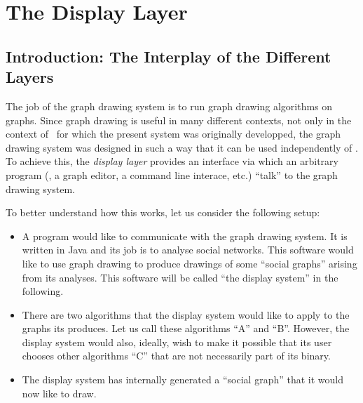 %
%
%


\section{The Display Layer}

{}


\label{section-gd-display-layer}


\subsection{Introduction: The Interplay of the Different Layers}

The job of the graph drawing system is to run graph drawing algorithms
on graphs. Since graph drawing is useful in many different contexts,
not only in the context of \tikzname\ for which the present system was
originally developped, the graph drawing system was designed in such a
way that it can be used independently of \tikzname. To achieve this,
the \emph{display layer} provides an interface via which an arbitrary
program (\tikzname, a graph editor, a command line interace, etc.)
``talk'' to the graph drawing system.

To better understand how this works, let us consider the following
setup: 

\begin{itemize}
\item A program would like to communicate with the graph
  drawing system. It is written in Java and its job is to analyse social
  networks. This software would like to use graph drawing to produce
  drawings of some ``social graphs'' arising from its analyses. This
  software will be called ``the display system'' in the following.
\item There are two algorithms that the display system would like to apply to
  the graphs its produces. Let us call these algorithms ``A'' and
  ``B''. However, the display system would also, ideally, wish to make it
  possible that its user chooses other algorithms ``C'' that are not
  necessarily part of its binary.
\item The display system has internally generated a ``social graph'' that it
  would now like to draw.
\end{itemize}

